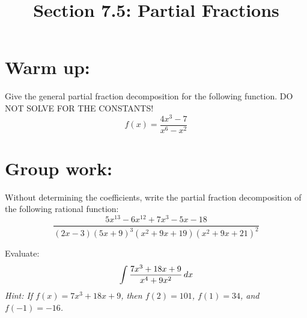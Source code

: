 \documentclass[noinstructornotes]{ximera}
\title{Section 7.5: Partial Fractions}
\begin{document}
\begin{abstract}		\end{abstract}
\maketitle



\section{Warm up:}
\begin{problem}
Give the general partial fraction decomposition for the following function.  DO NOT SOLVE FOR THE CONSTANTS! $$f(x) = \dfrac{4x^3-7}{x^6-x^2}$$

\end{problem}	


\section{Group work:}



\begin{problem}
Without determining the coefficients, write the partial fraction decomposition of the following rational function:
	\[
	\frac{5x^{13} - 6x^{12} + 7x^3 - 5x - 18}{(2x-3)(5x+9)^3 (x^2+9x+19)(x^2+9x+21)^2}
	\]
		
\end{problem}



\begin{problem}
Evaluate:
	\[
	\int \frac{7x^3 + 18x + 9}{x^4 + 9x^2} \,d x
	\]
{\it Hint:  If $f(x) = 7x^3 + 18x + 9$, then $f(2) = 101$, $f(1) = 34$, and $f(-1) = -16$.}
	
		
\end{problem}















	
	
	
	
	
	
	
	
	

	










								
				
				
	
\end{document}
